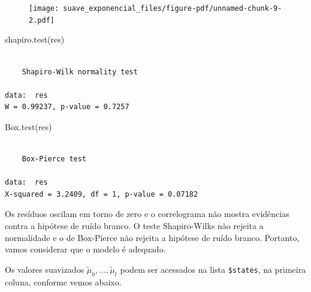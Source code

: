 \documentclass[
  letterpaper,
  DIV=11,
  numbers=noendperiod]{scrartcl}
\newenvironment{Shaded}{\begin{snugshade}}{\end{snugshade}}
\newcommand{\AttributeTok}[1]{\textcolor[rgb]{0.40,0.45,0.13}{#1}}
\newcommand{\DecValTok}[1]{\textcolor[rgb]{0.68,0.00,0.00}{#1}}
\newcommand{\FunctionTok}[1]{\textcolor[rgb]{0.28,0.35,0.67}{#1}}
\newcommand{\NormalTok}[1]{\textcolor[rgb]{0.00,0.23,0.31}{#1}}
\newcommand{\SpecialCharTok}[1]{\textcolor[rgb]{0.37,0.37,0.37}{#1}}
\newcommand{\StringTok}[1]{\textcolor[rgb]{0.13,0.47,0.30}{#1}}
\theoremstyle{plain}
\theoremstyle{plain}
\theoremstyle{definition}
\theoremstyle{definition}
\theoremstyle{remark}
\begin{document}
\begin{figure}[H]

{\centering \texttt{[image: suave\_exponencial\_files/figure-pdf/unnamed-chunk-9-2.pdf]}

}

\end{figure}

\begin{Shaded}
\begin{Highlighting}[]
\FunctionTok{shapiro.test}\NormalTok{(res)}
\end{Highlighting}
\end{Shaded}

\begin{verbatim}

    Shapiro-Wilk normality test

data:  res
W = 0.99237, p-value = 0.7257
\end{verbatim}

\begin{Shaded}
\begin{Highlighting}[]
\FunctionTok{Box.test}\NormalTok{(res)}
\end{Highlighting}
\end{Shaded}

\begin{verbatim}

    Box-Pierce test

data:  res
X-squared = 3.2409, df = 1, p-value = 0.07182
\end{verbatim}

Os resíduos oscilam em torno de zero e o correlograma não mostra
evidências contra a hipótese de ruído branco. O teste Shapiro-Wilks não
rejeita a normalidade e o de Box-Pierce não rejeita a hipótese de ruído
branco. Portanto, vamos considerar que o modelo é adequado.

Os valores suavizados \(\tilde{\mu}_0,\ldots,\tilde{\mu}_t\) podem ser
acessados na lista \texttt{\$states}, na primeira coluna, conforme vemos
abaixo.

\begin{Shaded}
\end{Shaded}
\end{document}
